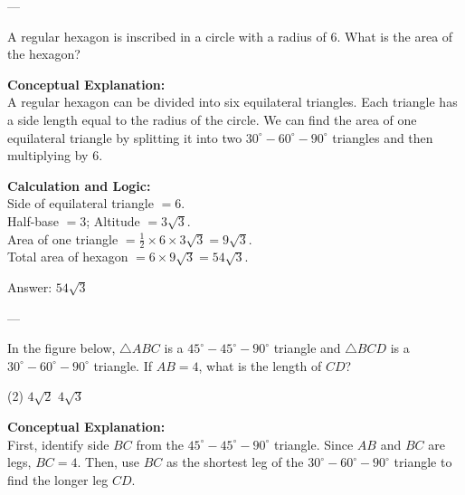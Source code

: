 \documentclass[11pt,paper=a4,answers]{exam}
\begin{document}
\begin{questions}
---

\question
A regular hexagon is inscribed in a circle with a radius of 6. What is the area of the hexagon?

\begin{solution}
\textbf{Conceptual Explanation:} \\
A regular hexagon can be divided into six equilateral triangles. Each triangle has a side length equal to the radius of the circle. We can find the area of one equilateral triangle by splitting it into two $30^\circ-60^\circ-90^\circ$ triangles and then multiplying by 6.

\vspace{10pt}
\textbf{Calculation and Logic:} \\
Side of equilateral triangle $= 6$. \\
Half-base $= 3$; Altitude $= 3\sqrt{3}$. \\
Area of one triangle $= \frac{1}{2} \times 6 \times 3\sqrt{3} = 9\sqrt{3}$. \\
Total area of hexagon $= 6 \times 9\sqrt{3} = 54\sqrt{3}$.

\vspace{15pt}
Answer: \colorbox{yellow!100}{$54\sqrt{3}$}
\end{solution}

---

\question
In the figure below, $\triangle ABC$ is a $45^\circ-45^\circ-90^\circ$ triangle and $\triangle BCD$ is a $30^\circ-60^\circ-90^\circ$ triangle. If $AB = 4$, what is the length of $CD$?
\begin{center}
\end{center}
\begin{tasks}(2)
    \task $4\sqrt{2}$
    \task $4\sqrt{3}$
\end{tasks}

\begin{solution}
\textbf{Conceptual Explanation:} \\
First, identify side $BC$ from the $45^\circ-45^\circ-90^\circ$ triangle. Since $AB$ and $BC$ are legs, $BC = 4$. Then, use $BC$ as the shortest leg of the $30^\circ-60^\circ-90^\circ$ triangle to find the longer leg $CD$.


\end{solution}
\end{questions}
\end{document}

